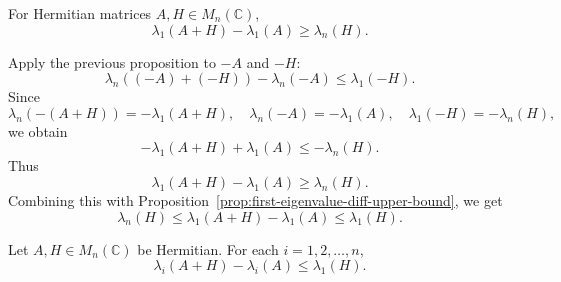 \begin{proposition}
For Hermitian matrices $A,H\in M_n(\mathbb{C})$,
\[
    \lambda_1(A+H)-\lambda_1(A)\ge\lambda_n(H).
\]
\end{proposition}

\begin{pfbox}
Apply the previous proposition to $-A$ and $-H$:
\[
    \lambda_n((-A)+(-H))-\lambda_n(-A)
    \le
    \lambda_1(-H).
\]
Since
\[
    \lambda_n(-(A+H))=-\lambda_1(A+H),
    \quad
    \lambda_n(-A)=-\lambda_1(A),
    \quad
    \lambda_1(-H)=-\lambda_n(H),
\]
we obtain
\[
    -\lambda_1(A+H)+\lambda_1(A)
    \le
    -\lambda_n(H).
\]
Thus
\[
    \lambda_1(A+H)-\lambda_1(A)
    \ge
    \lambda_n(H).
\]
Combining this with Proposition~\ref{prop:first-eigenvalue-diff-upper-bound}, we get
\[
    \lambda_n(H)
    \le
    \lambda_1(A+H)-\lambda_1(A)
    \le
    \lambda_1(H).
\]
\end{pfbox}


\begin{theorem}
Let $A,H\in M_n(\mathbb{C})$ be Hermitian. For each $i=1,2,\dots,n$,
\[
    \lambda_i(A+H)-\lambda_i(A)
    \le
    \lambda_1(H).
\]
\end{theorem}

